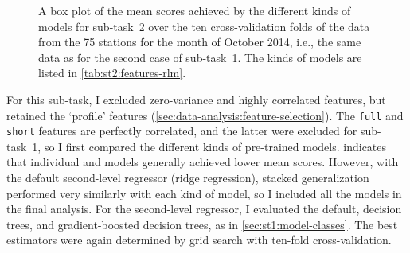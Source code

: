 \begin{figure}
  \centering
  \caption{A box plot of the mean scores achieved by the different kinds of models for
    sub-task~2 over the ten cross-validation folds of the data from the 75 stations for
    the month of October 2014, i.e., the same data as for the second case of sub-task~1.
    The kinds of models are listed in \cref{tab:st2:features-rlm}.
  }
  \label{fig:st2:box-plot}
\end{figure}

For this sub-task, I excluded zero-variance and highly correlated features, but
retained the `profile' features (\cref{sec:data-analysis:feature-selection}).
The \texttt{full} and \texttt{short} features are perfectly correlated, and the latter
were excluded for sub-task~1, so I first compared the different kinds of pre-trained
models.
 indicates that individual \rlmshort{} and \rlmshorttemp{} models
generally achieved lower mean scores.
However, with the default second-level regressor (ridge regression), stacked
generalization performed very similarly with each kind of model, so I included all the
models in the final analysis.
For the second-level regressor, I evaluated the default, decision trees, and
gradient-boosted decision trees, as in \cref{sec:st1:model-classes}.
The best estimators were again determined by grid search with ten-fold
cross-validation.

